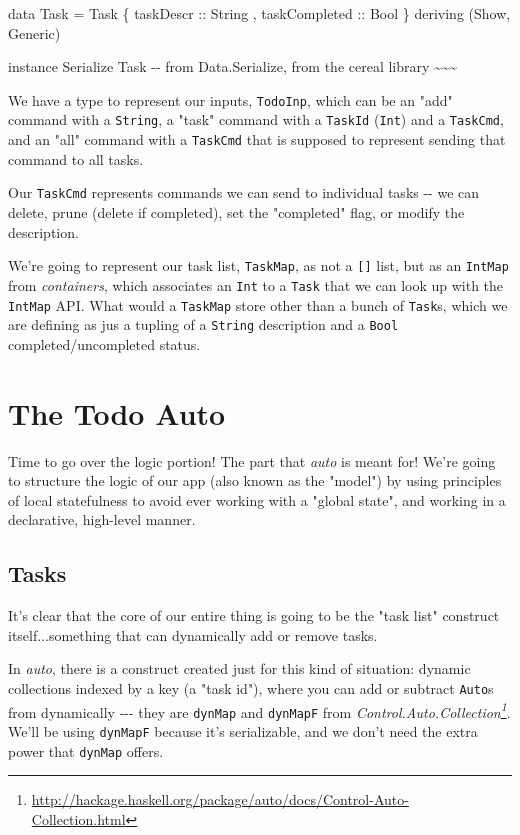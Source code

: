 \documentclass[]{article}
\renewcommand{\href}[2]{#2\footnote{\url{#1}}}
\begin{document}
data Task = Task \{ taskDescr :: String , taskCompleted :: Bool \} deriving
(Show, Generic)

instance Serialize Task -\/- from Data.Serialize, from the cereal library
\textasciitilde{}\textasciitilde{}\textasciitilde{}

We have a type to represent our inputs, \texttt{TodoInp}, which can be an "add"
command with a \texttt{String}, a "task" command with a \texttt{TaskId}
(\texttt{Int}) and a \texttt{TaskCmd}, and an "all" command with a
\texttt{TaskCmd} that is supposed to represent sending that command to all
tasks.

Our \texttt{TaskCmd} represents commands we can send to individual tasks -\/- we
can delete, prune (delete if completed), set the "completed" flag, or modify the
description.

We're going to represent our task list, \texttt{TaskMap}, as not a
\texttt{{[}{]}} list, but as an \texttt{IntMap} from \emph{containers}, which
associates an \texttt{Int} to a \texttt{Task} that we can look up with the
\texttt{IntMap} API. What would a \texttt{TaskMap} store other than a bunch of
\texttt{Task}s, which we are defining as jus a tupling of a \texttt{String}
description and a \texttt{Bool} completed/uncompleted status.

\section{The Todo Auto}

Time to go over the logic portion! The part that \emph{auto} is meant for! We're
going to structure the logic of our app (also known as the "model") by using
principles of local statefulness to avoid ever working with a "global state",
and working in a declarative, high-level manner.

\subsection{Tasks}

It's clear that the core of our entire thing is going to be the "task list"
construct itself...something that can dynamically add or remove tasks.

In \emph{auto}, there is a construct created just for this kind of situation:
dynamic collections indexed by a key (a "task id"), where you can add or
subtract \texttt{Auto}s from dynamically -\/-\/- they are \texttt{dynMap} and
\texttt{dynMapF} from
\emph{\href{http://hackage.haskell.org/package/auto/docs/Control-Auto-Collection.html}{Control.Auto.Collection}}.
We'll be using \texttt{dynMapF} because it's serializable, and we don't need the
extra power that \texttt{dynMap} offers.
\end{document}
